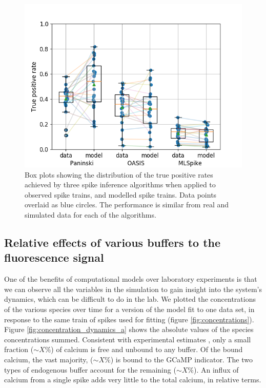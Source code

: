 \documentclass[a4paper,12pt]{article}
\theoremstyle{definition}
\begin{document}
\begin{figure}
  \includegraphics[width=\textwidth]{figures/three_algo_comparison_tp_paper.png}
  \caption{Box plots showing the distribution of the true positive rates achieved by three spike inference algorithms when applied to observed spike trains, and modelled spike trains. Data points overlaid as blue circles. The performance is similar from real and simulated data for each of the algorithms.}
  \label{fig:three_algo_comparison}
\end{figure}

\subsection{Relative effects of various buffers to the fluorescence signal}
One of the benefits of computational models over laboratory experiments is that we can observe all the variables in the simulation to gain insight into the system’s dynamics, which can be difficult to do in the lab. We plotted the concentrations of the various species over time for a version of the model fit to one data set, in response to the same train of spikes used for fitting (figure \ref{fig:concentrations}). Figure \ref{fig:concentration_dynamics_a} shows the absolute values of the species concentrations summed. Consistent with experimental estimates \cite{maravall}, only a small fraction ($\sim X\%$) of calcium is free and unbound to any buffer. Of the bound calcium, the vast majority, ($\sim X\%$) is bound to the GCaMP indicator. The two types of endogenous buffer account for the remaining ($\sim X\%$). An influx of calcium from a single spike adds very little to the total calcium, in relative terms. 
\end{document}
